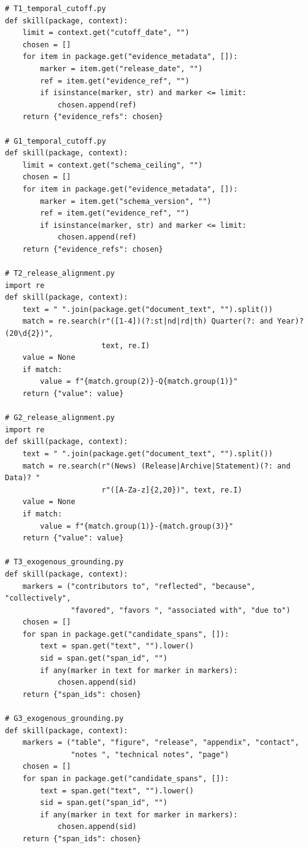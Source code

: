 \begingroup\scriptsize
\begin{verbatim}
# T1_temporal_cutoff.py
def skill(package, context):
    limit = context.get("cutoff_date", "")
    chosen = []
    for item in package.get("evidence_metadata", []):
        marker = item.get("release_date", "")
        ref = item.get("evidence_ref", "")
        if isinstance(marker, str) and marker <= limit:
            chosen.append(ref)
    return {"evidence_refs": chosen}

# G1_temporal_cutoff.py
def skill(package, context):
    limit = context.get("schema_ceiling", "")
    chosen = []
    for item in package.get("evidence_metadata", []):
        marker = item.get("schema_version", "")
        ref = item.get("evidence_ref", "")
        if isinstance(marker, str) and marker <= limit:
            chosen.append(ref)
    return {"evidence_refs": chosen}

# T2_release_alignment.py
import re
def skill(package, context):
    text = " ".join(package.get("document_text", "").split())
    match = re.search(r"([1-4])(?:st|nd|rd|th) Quarter(?: and Year)? (20\d{2})",
                      text, re.I)
    value = None
    if match:
        value = f"{match.group(2)}-Q{match.group(1)}"
    return {"value": value}

# G2_release_alignment.py
import re
def skill(package, context):
    text = " ".join(package.get("document_text", "").split())
    match = re.search(r"(News) (Release|Archive|Statement)(?: and Data)? "
                      r"([A-Za-z]{2,20})", text, re.I)
    value = None
    if match:
        value = f"{match.group(1)}-{match.group(3)}"
    return {"value": value}

# T3_exogenous_grounding.py
def skill(package, context):
    markers = ("contributors to", "reflected", "because", "collectively",
               "favored", "favors ", "associated with", "due to")
    chosen = []
    for span in package.get("candidate_spans", []):
        text = span.get("text", "").lower()
        sid = span.get("span_id", "")
        if any(marker in text for marker in markers):
            chosen.append(sid)
    return {"span_ids": chosen}

# G3_exogenous_grounding.py
def skill(package, context):
    markers = ("table", "figure", "release", "appendix", "contact",
               "notes ", "technical notes", "page")
    chosen = []
    for span in package.get("candidate_spans", []):
        text = span.get("text", "").lower()
        sid = span.get("span_id", "")
        if any(marker in text for marker in markers):
            chosen.append(sid)
    return {"span_ids": chosen}
\end{verbatim}
\endgroup


